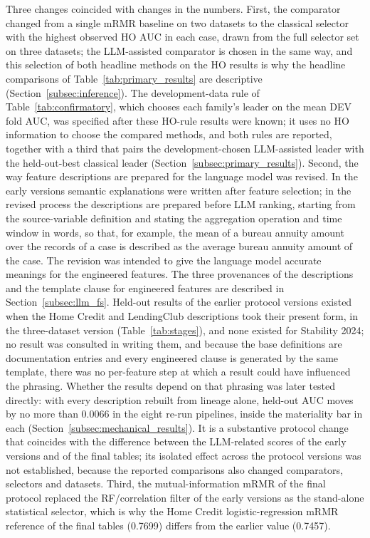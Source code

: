 \documentclass[final,5p,twocolumn]{elsarticle}
\providecommand{\DIFaddtex}[1]{{\protect\color{blue} \sf #1}} %
\providecommand{\DIFaddend}{} %
\providecommand{\DIFadd}[1]{\texorpdfstring{\DIFaddtex{#1}}{#1}} %
\begin{document}
\DIFadd{Three changes coincided with changes in the numbers. First, the comparator changed from a single mRMR baseline on two datasets to the classical selector with the highest observed HO AUC in each case, drawn from the full selector set on three datasets; the LLM-assisted comparator is chosen in the same way, and this selection of both headline methods on the HO results is why the headline comparisons of Table~\ref{tab:primary_results} are descriptive (Section~\ref{subsec:inference}). The development-data rule of Table~\ref{tab:confirmatory}, which chooses each family's leader on the mean DEV fold AUC, was specified after these HO-rule results were known; it uses no HO information to choose the compared methods, and both rules are reported, together with a third that pairs the development-chosen LLM-assisted leader with the held-out-best classical leader (Section~\ref{subsec:primary_results}). Second, the way feature descriptions are prepared for the language model was revised. In the early versions semantic explanations were written after feature selection; in the revised process the descriptions are prepared before LLM ranking, starting from the source-variable definition and stating the aggregation operation and time window in words, so that, for example, the mean of a bureau annuity amount over the records of a case is described as the average bureau annuity amount of the case. The revision was intended to give the language model accurate meanings for the engineered features. The three provenances of the descriptions and the template clause for engineered features are described in Section~\ref{subsec:llm_fs}. Held-out results of the earlier protocol versions existed when the Home Credit and LendingClub descriptions took their present form, in the three-dataset version (Table~\ref{tab:stages}), and none existed for Stability 2024; no result was consulted in writing them, and because the base definitions are documentation entries and every engineered clause is generated by the same template, there was no per-feature step at which a result could have influenced the phrasing. Whether the results depend on that phrasing was later tested directly: with every description rebuilt from lineage alone, held-out AUC moves by no more than 0.0066 in the eight re-run pipelines, inside the materiality bar in each (Section~\ref{subsec:mechanical_results}). It is a substantive protocol change that coincides with the difference between the LLM-related scores of the early versions and of the final tables; its isolated effect across the protocol versions was not established, because the reported comparisons also changed comparators, selectors and datasets. Third, the mutual-information mRMR of the final protocol replaced the RF/correlation filter of the early versions as the stand-alone statistical selector, which is why the Home Credit logistic-regression mRMR reference of the final tables (0.7699) differs from the earlier value (0.7457)}\DIFaddend .
\end{document}
